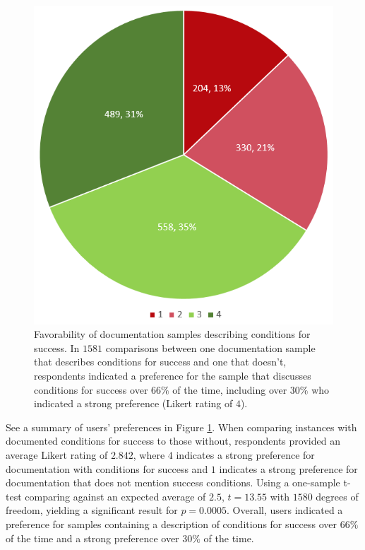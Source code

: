 \documentclass[preprint]{sigplanconf}
\begin{document}
\begin{figure}
	\begin{center}
	\end{center}
	\includegraphics[width=\columnwidth]{conditions-for-success-likert.png}
	\caption{Favorability of documentation samples describing conditions for success. In \(1581\) comparisons between one documentation sample that describes conditions for success and one that doesn't, respondents indicated a preference for the sample that discusses conditions for success over \(66\%\) of the time, including over \(30\%\) who indicated a strong preference (Likert rating of \(4\)).}
	\label{figure-cfs}
\end{figure}

See a summary of users' preferences in Figure \ref{figure-cfs}. When comparing instances with documented conditions for success to those without, respondents provided an average Likert rating of \(2.842\), where \(4\) indicates a strong preference for documentation with conditions for success and \(1\) indicates a strong preference for documentation that does not mention success conditions. Using a one-sample t-test comparing against an expected average of \(2.5\), \(t = 13.55\) with \(1580\) degrees of freedom, yielding a significant result for \(p = 0.0005\). Overall, users indicated a preference for samples containing a description of conditions for success over \(66\%\) of the time and a strong preference over \(30\%\) of the time.
\end{document}
